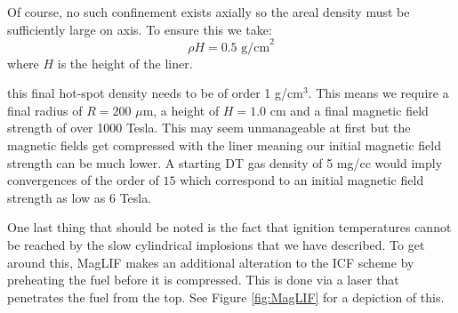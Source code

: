 Of course, no such confinement exists axially so the areal density must be sufficiently large on axis. To ensure this we take:
%
\begin{equation}
	\rho H = 0.5 \text{ g/cm}^2
\end{equation}
%
where $H$ is the height of the liner.  

 this final hot-spot density needs to be of order 1 g/cm$^3$. This means we require a final radius of $R=200$ $\mu$m, a height of $H=1.0$ cm and a final magnetic field strength of over 1000 Tesla. This may seem unmanageable at first but the magnetic fields get compressed with the liner meaning our initial magnetic field strength can be much lower. A starting DT gas density of 5 mg/cc would imply convergences of the order of $15$ which correspond to an initial magnetic field strength as low as 6 Tesla. 

One last thing that should be noted is the fact that ignition temperatures cannot be reached by the slow cylindrical implosions that we have described. To get around this, MagLIF makes an additional alteration to the ICF scheme by preheating the fuel before it is compressed. This is done via a laser that penetrates the fuel from the top. See Figure \ref{fig:MagLIF} for a depiction of this.





